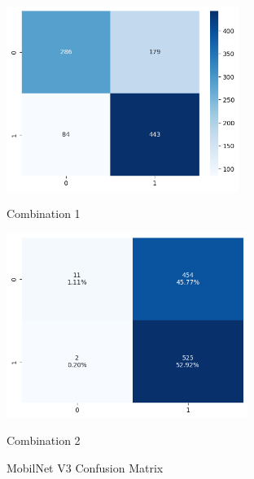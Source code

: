 \begin{figure}[H]
    \centering
    \begin{minipage}[b]{0.49\textwidth}
        \centering
        \includegraphics[width=\textwidth, height=6cm]{Figures/balanced_data/less_data/withoutbn/mn3/cm.png}
        \captionsetup{labelformat=empty}
        \caption{Combination 1}
        \label{fig:u_wo_r_cm}
    \end{minipage}
    \hfill
    \begin{minipage}[b]{0.49\textwidth}
        \centering
        \includegraphics[width=\textwidth, height=6cm]{Figures/balanced_data/less_data/withbn/mn3/cm.png}
        \captionsetup{labelformat=empty}
        \caption{Combination 2}
        \label{fig:u_w_r_cm}
    \end{minipage}
    \captionsetup{labelformat=default}
    \caption{MobilNet V3 Confusion Matrix}
\end{figure}


